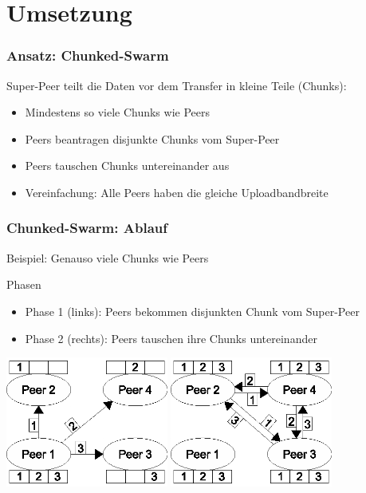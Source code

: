 \section{Umsetzung}


\begin{frame}
  \frametitle{Ansatz: Chunked-Swarm}
  Super-Peer teilt die Daten vor dem Transfer in kleine Teile (Chunks):
  \vspace{1mm}
  \begin{itemize}  
    \item Mindestens so viele Chunks wie Peers
    \item Peers beantragen disjunkte Chunks vom Super-Peer
    \item Peers tauschen Chunks untereinander aus
    \item Vereinfachung: Alle Peers haben die gleiche Uploadbandbreite
  \end{itemize} 
\end{frame}


\begin{frame}
  \frametitle{Chunked-Swarm: Ablauf}
  Beispiel: Genauso viele Chunks wie Peers
  \begin{exampleblock}{Phasen}  
    \begin{itemize}
      \item Phase 1 (links): Peers bekommen disjunkten Chunk vom Super-Peer
      \item Phase 2 (rechts): Peers tauschen ihre Chunks untereinander 
    \end{itemize}
  \end{exampleblock}
  \begin{center}
    \includegraphics[width=0.4\textwidth]{fig/chunkedswarmmodel1.eps}
    \hspace{0.15\textwidth}
    \includegraphics[width=0.4\textwidth]{fig/chunkedswarmmodel2.eps}
  \end{center}
\end{frame}


